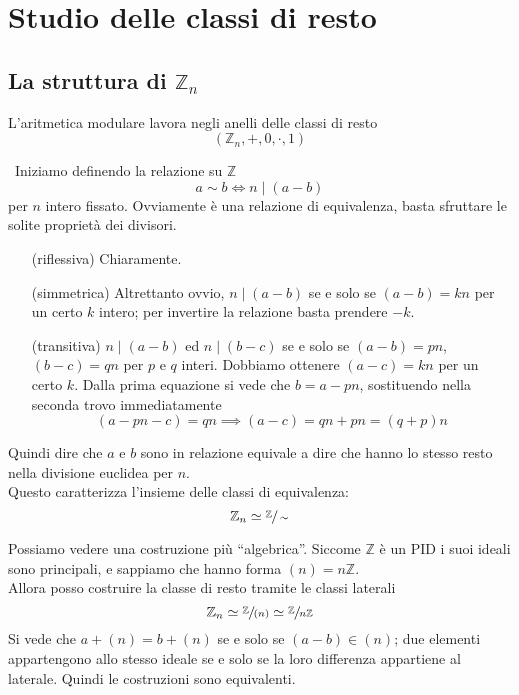 \section{Studio delle classi di resto}
\label{lezione6}
\subsection{La struttura di $\mathbb{Z}_n$}
L'aritmetica modulare lavora negli anelli delle classi di resto
\begin{equation*}
\left(\mathbb{Z}_n,+,0,\cdot,1\right)
\end{equation*}
\begin{osservazione}\
	Iniziamo definendo la relazione su $\mathbb{Z}$ 
	\begin{equation*}
	a\sim b \iff n \mid (a-b) 
	\end{equation*}
	per $n$ intero fissato. Ovviamente è una relazione di equivalenza, basta sfruttare le solite proprietà dei divisori. 
	\begin{itemize}
		\item[(riflessiva)] Chiaramente.
		\item[(simmetrica)] Altrettanto ovvio, $n\mid(a-b)$ se e solo se $(a-b)=kn$ per un certo $k$ intero; per invertire la relazione basta prendere $-k$.
		\item[(transitiva)] $n\mid(a-b)$ ed $n\mid(b-c)$ se e solo se $(a-b)=pn$, $(b-c)=qn$ per $p$ e $q$ interi. Dobbiamo ottenere $(a-c)=kn$ per un certo $k$. Dalla prima equazione si vede che $b=a-pn$, sostituendo nella seconda trovo immediatamente
		\begin{equation*}
		(a-pn-c)=qn\implies (a-c)=qn+pn=(q+p)n
		\end{equation*}
	\end{itemize}
	Quindi dire che $a$ e $b$ sono in relazione equivale a dire che hanno lo stesso resto nella divisione euclidea per $n$. \\ Questo caratterizza l'insieme delle classi di equivalenza:
	\begin{equation*}
	\mathbb{Z}_n \simeq \sfrac{\mathbb{Z}}{\sim}
	\end{equation*}
\end{osservazione}
\begin{osservazione}
	Possiamo vedere una costruzione più \enquote{algebrica}. Siccome $\mathbb{Z}$ è un PID i suoi ideali sono principali, e sappiamo che hanno forma $(n)=n\mathbb{Z}$. \\ Allora posso costruire la classe di resto tramite le classi laterali
		\begin{equation*}
		\mathbb{Z}_n\simeq\sfrac{\mathbb{Z}}{(n)}\simeq\sfrac{\mathbb{Z}}{n\mathbb{Z}}
		\end{equation*}
		Si vede che $a+(n)=b+(n)$ se e solo se $(a-b)\in(n)$; due elementi appartengono allo stesso ideale se e solo se la loro differenza appartiene al laterale. Quindi le costruzioni sono equivalenti.

\end{osservazione}
